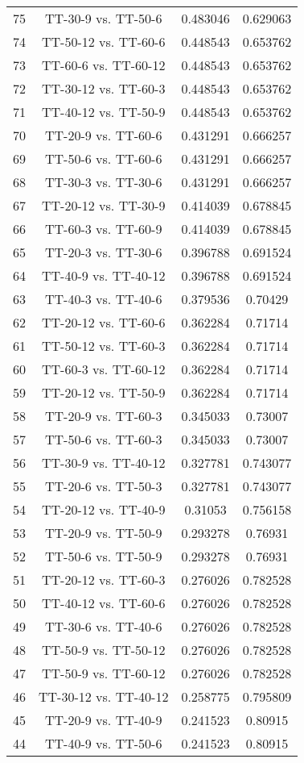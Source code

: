 \documentclass[a4paper,10pt]{article}
\begin{document}
\begin{landscape}
\begin{table}[!htp]
\begin{tabular}{cccc}
75&TT-30-9 vs. TT-50-6&0.483046&0.629063\\
74&TT-50-12 vs. TT-60-6&0.448543&0.653762\\
73&TT-60-6 vs. TT-60-12&0.448543&0.653762\\
72&TT-30-12 vs. TT-60-3&0.448543&0.653762\\
71&TT-40-12 vs. TT-50-9&0.448543&0.653762\\
70&TT-20-9 vs. TT-60-6&0.431291&0.666257\\
69&TT-50-6 vs. TT-60-6&0.431291&0.666257\\
68&TT-30-3 vs. TT-30-6&0.431291&0.666257\\
67&TT-20-12 vs. TT-30-9&0.414039&0.678845\\
66&TT-60-3 vs. TT-60-9&0.414039&0.678845\\
65&TT-20-3 vs. TT-30-6&0.396788&0.691524\\
64&TT-40-9 vs. TT-40-12&0.396788&0.691524\\
63&TT-40-3 vs. TT-40-6&0.379536&0.70429\\
62&TT-20-12 vs. TT-60-6&0.362284&0.71714\\
61&TT-50-12 vs. TT-60-3&0.362284&0.71714\\
60&TT-60-3 vs. TT-60-12&0.362284&0.71714\\
59&TT-20-12 vs. TT-50-9&0.362284&0.71714\\
58&TT-20-9 vs. TT-60-3&0.345033&0.73007\\
57&TT-50-6 vs. TT-60-3&0.345033&0.73007\\
56&TT-30-9 vs. TT-40-12&0.327781&0.743077\\
55&TT-20-6 vs. TT-50-3&0.327781&0.743077\\
54&TT-20-12 vs. TT-40-9&0.31053&0.756158\\
53&TT-20-9 vs. TT-50-9&0.293278&0.76931\\
52&TT-50-6 vs. TT-50-9&0.293278&0.76931\\
51&TT-20-12 vs. TT-60-3&0.276026&0.782528\\
50&TT-40-12 vs. TT-60-6&0.276026&0.782528\\
49&TT-30-6 vs. TT-40-6&0.276026&0.782528\\
48&TT-50-9 vs. TT-50-12&0.276026&0.782528\\
47&TT-50-9 vs. TT-60-12&0.276026&0.782528\\
46&TT-30-12 vs. TT-40-12&0.258775&0.795809\\
45&TT-20-9 vs. TT-40-9&0.241523&0.80915\\
44&TT-40-9 vs. TT-50-6&0.241523&0.80915\\

\end{tabular}
\end{table}
\end{landscape}
\end{document}
